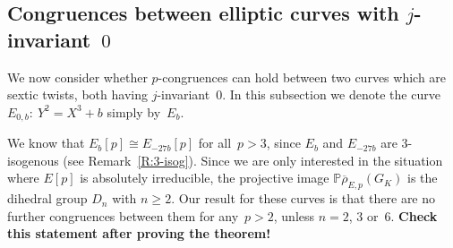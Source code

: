 \documentclass[12pt, reqno]{amsart}
\newcommand{\PP}{\mathbb{P}}
\newcommand{\rhobar}{{\overline{\rho}}}
\numberwithin{equation}{section}
\theoremstyle{definition}
\theoremstyle{remark}
\begin{document}
\subsection{Congruences between elliptic curves with
  $j$-invariant~$0$}

We now consider whether $p$-congruences can hold between two curves
which are sextic twists, both having $j$-invariant~$0$.  In this
subsection we denote the curve $E_{0,b}:\ Y^2=X^3+b$ simply by~$E_b$.

We know that $E_b[p]\cong E_{-27b}[p]$ for all~$p>3$, since $E_b$ and
$E_{-27b}$ are $3$-isogenous (see Remark~\ref{R:3-isog}).  Since we
are only interested in the situation where $E[p]$ is absolutely
irreducible, the projective image $\PP\rhobar_{E,p}(G_K)$ is the
dihedral group $D_n$ with $n\ge2$.  Our result for these curves is
that there are no further congruences between them for any~$p>2$,
unless $n=2$, $3$ or~$6$. \textbf{Check this statement after proving
  the theorem!}
\end{document}
